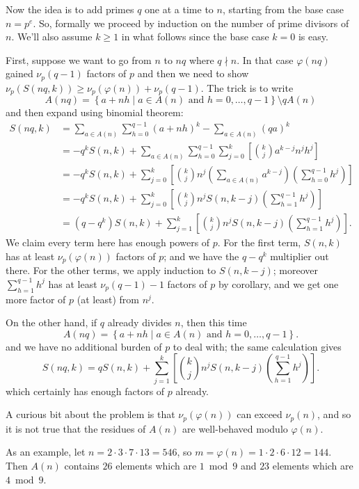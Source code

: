 \documentclass[11pt]{scrartcl}
\begin{document}
Now the idea is to add primes $q$ one at a time to $n$,
starting from the base case $n = p^e$.
So, formally we proceed by induction on the number
of prime divisors of $n$.
We'll also assume $k \ge 1$ in what follows
since the base case $k=0$ is easy.

\begin{itemize}
\ii First, suppose we want to go from $n$ to $nq$
where $q \nmid n$.
In that case $\varphi(nq)$ gained $\nu_p(q-1)$ factors of $p$
and then we need to show $\nu_p(S(nq,k)) \ge \nu_p(\varphi(n)) + \nu_p(q-1)$.
The trick is to write
\[ A(nq) = \left\{ a + nh \mid a \in A(n)
    \text{ and } h = 0,\dots,q-1 \right\}
    \setminus qA(n)  \]
and then expand using binomial theorem:
\begin{align*}
  S(nq, k) &=
  \sum_{a \in A(n)} \sum_{h=0}^{q-1} (a+nh)^k
  - \sum_{a \in A(n)} (qa)^k \\
  &= -q^k S(n,k) + \sum_{a \in A(n)} \sum_{h=0}^{q-1} \sum_{j=0}^k
    \left[ \binom kj a^{k-j} n^j h^j \right] \\
  &= -q^k S(n,k) +
    \sum_{j=0}^k \left[ \binom kj n^j \left( \sum_{a \in A(n)} a^{k-j} \right)
    \left( \sum_{h=0}^{q-1} h^j \right) \right] \\
  &= -q^k S(n,k) + \sum_{j=0}^k \left[ \binom kj n^j S(n,k-j)
    \left( \sum_{h=1}^{q-1} h^j \right) \right] \\
  &= (q-q^k) S(n,k)
    + \sum_{j=1}^k \left[ \binom kj n^j S(n,k-j)
    \left( \sum_{h=1}^{q-1} h^j \right) \right].
\end{align*}
We claim every term here has enough powers of $p$.
For the first term, $S(n,k)$
has at least $\nu_p(\varphi(n))$ factors of $p$;
and we have the $q-q^k$ multiplier out there.
For the other terms, we apply induction to $S(n,k-j)$;
moreover $\sum_{h=1}^{q-1} h^j$
has at least $\nu_p(q-1)-1$ factors of $p$ by corollary,
and we get one more factor of $p$ (at least) from $n^j$.

\ii On the other hand, if $q$ already divides $n$,
then this time
\[ A(nq) = \left\{ a + nh \mid a \in A(n)
    \text{ and } h = 0,\dots,q-1 \right\}.  \]
and we have no additional burden of $p$ to deal with;
the same calculation gives
\[ S(nq,k) = qS(n,k)
  + \sum_{j=1}^k \left[ \binom kj n^j S(n,k-j)
  \left( \sum_{h=1}^{q-1} h^j \right) \right].
\]
which certainly has enough factors of $p$ already.
\end{itemize}

\begin{remark*}
  A curious bit about the problem is
  that $\nu_p(\varphi(n))$ can exceed $\nu_p(n)$,
  and so it is not true that the residues
  of $A(n)$ are well-behaved modulo $\varphi(n)$.

  As an example, let $n = 2 \cdot 3 \cdot 7 \cdot 13 = 546$,
  so $m = \varphi(n) = 1 \cdot 2 \cdot 6 \cdot 12 = 144$.
  Then $A(n)$ contains $26$ elements which are $1 \bmod 9$
  and $23$ elements which are $4 \bmod 9$.
\end{remark*}
\end{document}
